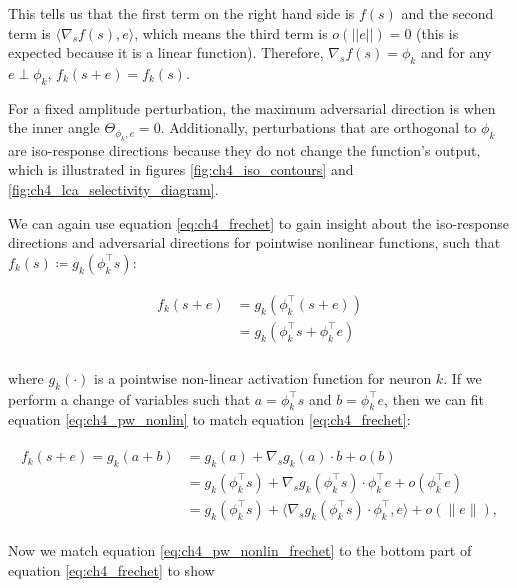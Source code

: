 This tells us that the first term on the right hand side is $f(s)$ and the second term is $\langle\nabla_{s}f(s), e\rangle$, which means the third term is $o(||e||)=0$ (this is expected because it is a linear function). Therefore,  $\nabla_{s}f(s) = \phi_{k}$ and for any $e \perp \phi_{k}$, $f_{k}(s+e) = f_{k}(s)$.

For a fixed amplitude perturbation, the maximum adversarial direction is when the inner angle $\Theta_{\phi_{k},e} = 0$. Additionally, perturbations that are orthogonal to $\phi_{k}$ are iso-response directions because they do not change the function's output, which is illustrated in figures \ref{fig:ch4_iso_contours} and \ref{fig:ch4_lca_selectivity_diagram}.

We can again use equation \eqref{eq:ch4_frechet} to gain insight about the iso-response directions and adversarial directions for pointwise nonlinear functions, such that $f_{k}(s) \coloneqq g_{k}(\phi_{k}^\top s)$:

\begin{align}\label{eq:ch4_pw_nonlin}
\begin{split}
  f_{k}(s+e) &= g_{k}(\phi_{k}^\top(s+e)) \\
  &=g_{k}(\phi_{k}^\top s + \phi_{k}^\top e) \\
\end{split}
\end{align}

where $g_{k}(\cdot)$ is a pointwise non-linear activation function for neuron $k$. If we perform a change of variables such that $a = \phi_{k}^\top s$ and $b = \phi_{k}^\top e$, then we can fit equation \eqref{eq:ch4_pw_nonlin} to match equation \eqref{eq:ch4_frechet}:

\begin{align}\label{eq:ch4_pw_nonlin_frechet}
\begin{split}
    f_{k}(s + e) = g_{k}(a + b) &= g_{k}(a) + \nabla_{s}g_{k}(a) \cdot b + o(b) \\
    &=g_{k}(\phi_{k}^\top s) + \nabla_{s}g_{k}(\phi_{k}^\top s) \cdot \phi_{k}^\top e + o(\phi_{k}^\top e)\\
    &=g_{k}(\phi_{k}^\top s) + \langle\nabla_{s}g_{k}(\phi_{k}^\top s) \cdot \phi_{k}^\top, e\rangle + o(\|e\|),
\end{split}
\end{align}

Now we match equation \eqref{eq:ch4_pw_nonlin_frechet} to the bottom part of equation \eqref{eq:ch4_frechet} to show 

